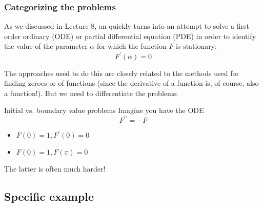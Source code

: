 \documentclass[hyperref={colorlinks=true}]{beamer}
\begin{document}
\begin{frame}%
  \frametitle{Categorizing the problems}

  As we discussed in Lecture 8, an  quickly turns into an attempt to solve a first-order ordinary (ODE) or partial differential equation (PDE) in order to identify the value of the parameter $\alpha$ for which the function $F$ is stationary:
  \begin{equation}
    F^{\prime}(\alpha) = 0
  \end{equation}
  
  The approaches used to do this are closely related to the methods used for finding zeroes or  of functions (since the derivative of a function is, of course, also a function!). But we need to differentiate the problems:
  
  \begin{ucblock}{Initial vs. boundary value problems}
    Imagine you have the ODE
    \begin{equation}
      F^{\prime\prime} = -F
    \end{equation}
    \vspace{-0.5cm}
    \begin{itemize}
      \item {}  $F(0)=1, F^{\prime}(0)=0$
      \item {} $F(0)=1, F(\pi)=0$
    \end{itemize} 
    The latter is often much harder!
  \end{ucblock}
  
  

\end{frame}

\subsection[Specific example]{Specific example}
\end{document}
